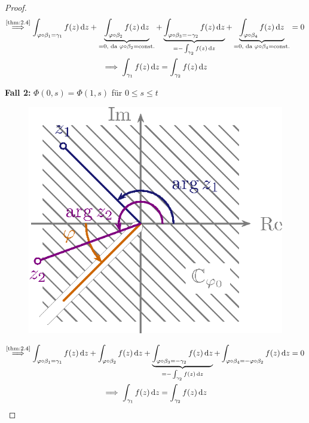 \documentclass[a4paper,10pt]{scrbook}
\begin{document}
\begin{notice}[Folgerung]
\begin{proof}
    \begin{gather*}
      \overset{\text{\ref{thm:2.4}}}{\implies}
      \int_{\varphi \circ \beta_1 = \gamma_1} f(z) \, \mathrm{d}z
      + \underbrace{\int_{\varphi \circ \beta_2} f(z) \, \mathrm{d}z}_{=0 \text{, da } \varphi \circ \beta_2 = \mathrm{const.}}
      + \underbrace{\int_{\varphi \circ \beta_3 = -\gamma_2} f(z) \, \mathrm{d}z}_{= - \int_{\gamma_2} f(z) \, \mathrm{d}z}
      + \underbrace{\int_{\varphi \circ \beta_4} f(z) \, \mathrm{d}z}_{=0 \text{, da } \varphi \circ \beta_4 = \mathrm{const.}} = 0 \\
      \implies \int_{\gamma_1} f(z) \, \mathrm{d}z = \int_{\gamma_2} f(z) \, \mathrm{d}z
    \end{gather*}

    \textbf{Fall 2:} $\Phi(0,s) = \Phi(1,s)$ für $0 \leq s \leq t$

    \begin{figure}[H]
      \centering
      \includegraphics[scale=0.2]{images/ana3-tmp-16}
    \end{figure}

    \begin{gather*}
      \overset{\text{\ref{thm:2.4}}}{\implies}
      \int_{\varphi \circ \beta_1 = \gamma_1} f(z) \, \mathrm{d}z
      + \int_{\varphi \circ \beta_2} f(z) \, \mathrm{d}z
      + \underbrace{\int_{\varphi \circ \beta_3 = - \gamma_2} f(z) \, \mathrm{d}z}_{= - \int_{\gamma_2} f(z) \, \mathrm{d}z}
      + \int_{\varphi \circ \beta_4 = - \varphi \circ \beta_2} f(z) \, \mathrm{d}z = 0 \\
      \implies \int_{\gamma_1} f(z) \, \mathrm{d}z = \int_{\gamma_2} f(z) \, \mathrm{d}z
    \end{gather*}
  \end{proof}
\end{notice}
\end{document}
